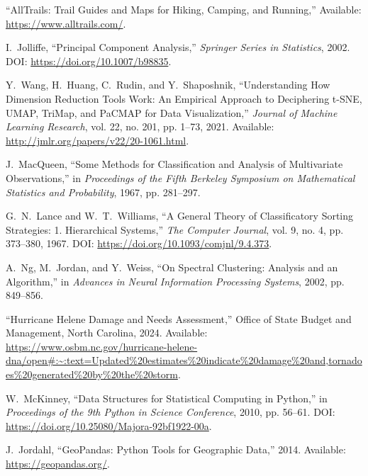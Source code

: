 \documentclass[12pt]{article}
\begin{document}
\clearpage
\begin{thebibliography}{9}

    ``AllTrails: Trail Guides and Maps for Hiking, Camping, and Running,'' 
    Available: \url{https://www.alltrails.com/}.

    I.~Jolliffe, 
    ``Principal Component Analysis,'' 
    \textit{Springer Series in Statistics}, 2002. 
    DOI: \url{https://doi.org/10.1007/b98835}.

    Y.~Wang, H.~Huang, C.~Rudin, and Y.~Shaposhnik, 
    ``Understanding How Dimension Reduction Tools Work: An Empirical Approach to Deciphering t-SNE, UMAP, TriMap, and PaCMAP for Data Visualization,''
    \textit{Journal of Machine Learning Research}, vol. 22, no. 201, pp. 1--73, 2021. 
    Available: \url{http://jmlr.org/papers/v22/20-1061.html}.

    J.~MacQueen, 
    ``Some Methods for Classification and Analysis of Multivariate Observations,'' 
    in \textit{Proceedings of the Fifth Berkeley Symposium on Mathematical Statistics and Probability}, 1967, pp. 281--297.

    G.~N.~Lance and W.~T.~Williams, 
    ``A General Theory of Classificatory Sorting Strategies: 1. Hierarchical Systems,'' 
    \textit{The Computer Journal}, vol. 9, no. 4, pp. 373--380, 1967. 
    DOI: \url{https://doi.org/10.1093/comjnl/9.4.373}.

    A.~Ng, M.~Jordan, and Y.~Weiss, 
    ``On Spectral Clustering: Analysis and an Algorithm,'' 
    in \textit{Advances in Neural Information Processing Systems}, 2002, pp. 849--856.

    ``Hurricane Helene Damage and Needs Assessment,'' 
    Office of State Budget and Management, North Carolina, 2024. 
    Available: \url{https://www.osbm.nc.gov/hurricane-helene-dna/open#:~:text=Updated%20estimates%20indicate%20damage%20and,tornadoes%20generated%20by%20the%20storm}.


    W.~McKinney, 
    ``Data Structures for Statistical Computing in Python,'' 
    in \textit{Proceedings of the 9th Python in Science Conference}, 2010, pp. 56--61. 
    DOI: \url{https://doi.org/10.25080/Majora-92bf1922-00a}.

    J.~Jordahl, 
    ``GeoPandas: Python Tools for Geographic Data,'' 
    2014. 
    Available: \url{https://geopandas.org/}.

\end{thebibliography}
\end{document}
